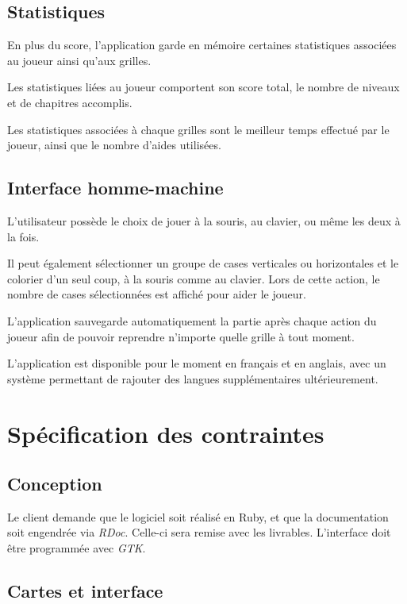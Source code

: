 \documentclass[a4paper, 12pt]{report}
\begin{document}
		\section{Statistiques}
		
			En plus du score, l'application garde en mémoire certaines statistiques associées au joueur ainsi qu'aux grilles. 
			
			Les statistiques liées au joueur comportent son score total, le nombre de niveaux et de chapitres accomplis. 
		
			Les statistiques associées à chaque grilles sont le meilleur temps effectué par le joueur, ainsi que le nombre d'aides utilisées.

		\section{Interface homme-machine}
		
			L'utilisateur possède le choix de jouer à la souris, au clavier, ou même les deux à la fois.
			
			Il peut également sélectionner un groupe de cases verticales ou horizontales et le colorier d'un seul coup, à la souris comme au clavier. Lors de cette action, le nombre de cases sélectionnées est affiché pour aider le joueur. 
			
			L'application sauvegarde automatiquement la partie après chaque action du joueur afin de pouvoir reprendre n'importe quelle grille à tout moment.
			
			L'application est disponible pour le moment en français et en anglais, avec un système permettant de rajouter des langues supplémentaires ultérieurement.


\chapter{Spécification des contraintes}
\vspace*{0.5cm}
	\section{Conception}
	
		Le client demande que le logiciel soit réalisé en Ruby, et que la documentation soit engendrée via \textit{RDoc}. Celle-ci sera remise avec les livrables. L'interface doit être programmée avec \textit{GTK}.
		
	\section{Cartes et interface}
	
\end{document}
